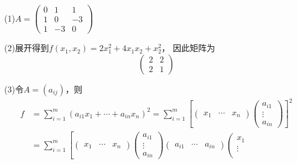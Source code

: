 \begin{solution}
  (1)$A = \left(
    \begin{array}{ccc}
      0&1&1 \\
       1&0&-3 \\
       1&-3&0
    \end{array}
  \right)$

  (2)展开得到$f(x_1,x_2) = 2x_1^2 + 4x_1x_2 + x_2^2$，
  因此矩阵为
  \begin{equation*}
    \left(
      \begin{array}{cc}
        2&2\\
        2&1
      \end{array}
    \right)
  \end{equation*}

  (3)令$A = (a_{ij})$，则
  \begin{align*}
    f &= \sum\limits_{i = 1}^m (a_{i1}x_1 + \cdots + a_{in}x_n)^2 = \sum\limits_{i = 1}^m \left[
        \left(
        \begin{array}{ccc}
          x_1&\cdots&x_n
        \end{array}
        \right)
                      \left(
                      \begin{array}{c}
                        a_{i1}\\
                        \vdots\\
                        a_{in}
                      \end{array}
                      \right)
    \right]^2\\
      &= \sum\limits_{i = 1}^m \left[ \left(
        \begin{array}{ccc}
          x_1&\cdots&x_n
        \end{array}
                      \right)
                      \left(
                      \begin{array}{c}
                        a_{i1}\\
                        \vdots\\
                        a_{in}
                      \end{array}
    \right)
    \left(
    \begin{array}{ccc}
      a_{i1}&\cdots&a_{in}
    \end{array}
    \right)
                     \left(
                     \begin{array}{c}
                       x_1\\
                       \vdots\\

\end{array}
\end{align*}
\end{solution}
